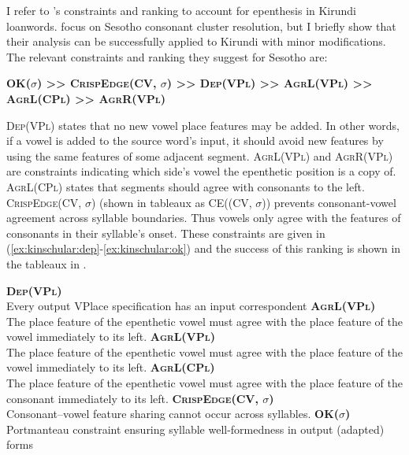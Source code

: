 \documentclass[output=paper,colorlinks,citecolor=brown,
]{langscibook}
\begin{document}
I refer to \citet{Rose}'s constraints and ranking to account for epenthesis in Kirundi loanwords. \citeauthor{Rose} focus on Sesotho consonant cluster resolution, but I briefly show that their analysis can be successfully applied to Kirundi with minor modifications. The relevant constraints and ranking they suggest for Sesotho are: 

 \ea \label{ex:kinchsular:sesothoconstraints}
 \textbf{OK($\sigma$) >> \textsc{CrispEdge}(CV, $\sigma$) >> D\textsc{ep}(VP\textsc{l}) >> \textsc{Agr}L(VP\textsc{l}) >> \textsc{Agr}L(CP\textsc{l}) >> \textsc{Agr}R(VP\textsc{l})}  

\z 

D\textsc{ep}(VP\textsc{l}) states that no new vowel place features may be added. In other words, if a vowel is added to the source word’s input, it should avoid new features by using the same features of some adjacent segment. \textsc{Agr}L(VP\textsc{l}) and \textsc{Agr}R(VP\textsc{l}) are constraints indicating which side’s vowel the epenthetic position is a copy of. \textsc{Agr}L(CP\textsc{l}) states that segments should agree with consonants to the left. \textsc{CrispEdge}(CV, $\sigma$) (shown in tableaux as CE((CV, $\sigma$)) prevents consonant-vowel agreement across syllable boundaries. Thus vowels only agree with the features of consonants in their syllable’s onset. These constraints are given in (\ref{ex:kinschular:dep}-\ref{ex:kinschular:ok}) and the success of this ranking is shown in the tableaux in .

 \ea \label{ex:kinchsular:sesothoconstraints2}
\begin{xlist}
        \ex \label{ex:kinschular:dep} \textbf{D\textsc{ep}(VP\textsc{l})} \hfill \citep{Rose} \\  Every output VPlace specification has an input correspondent
        \ex \label{ex:kinschular:agrvl} \textbf{\textsc{AgrL(VPl)}} \\
         The place feature of the epenthetic vowel must agree with the place feature of the vowel immediately to its left.
        \ex \label{ex:kinschular:agrvl2} \textbf{\textsc{AgrL(VPl)}} \\
         The place feature of the epenthetic vowel must agree with the place feature of the vowel immediately to its left.
         \ex \label{ex:kinschular:agrcl}\textbf{\textsc{AgrL(CPl)}} \\
         The place feature of the epenthetic vowel must agree with the place feature of the consonant immediately to its left.
        \ex \label{ex:kinschular:ce}\textbf{\textsc{CrispEdge}(CV, $\sigma$)} \\ Consonant–vowel feature sharing cannot occur across syllables.
        \ex \label{ex:kinschular:ok} \textbf{OK($\sigma$)}\\ Portmanteau constraint ensuring syllable well-formedness in output (adapted) forms
\end{xlist}
\z 
\end{document}

